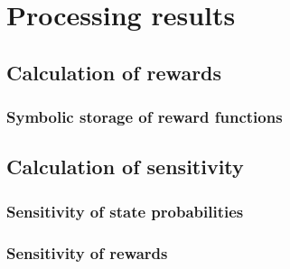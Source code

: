 \section{Processing results}

\subsection{Calculation of rewards}

\subsubsection{Symbolic storage of reward functions}

\subsection{Calculation of sensitivity}

\subsubsection{Sensitivity of state probabilities}

\subsubsection{Sensitivity of rewards}